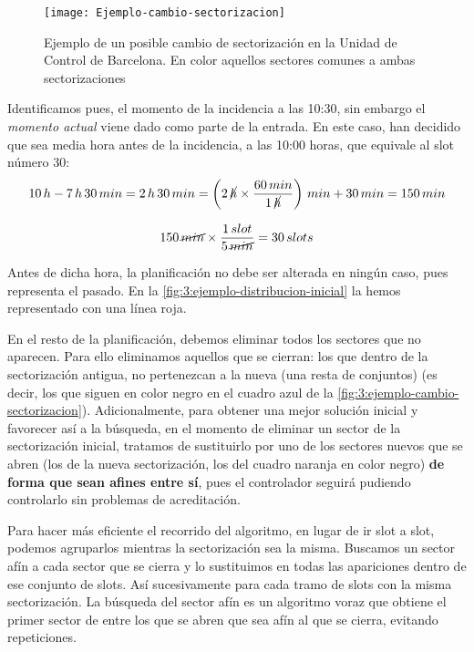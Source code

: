 \begin{figure}[htbp]
	\centering
	\texttt{[image: Ejemplo-cambio-sectorizacion]}
	\caption[Ejemplo de cambio de sectorización]{Ejemplo de un posible cambio de sectorización en la Unidad de Control 
	de Barcelona. En color aquellos sectores comunes a ambas sectorizaciones}
	\label{fig:3:ejemplo-cambio-sectorizacion}
\end{figure}


Identificamos pues, el momento de la incidencia a las 10:30, sin embargo el \textit{momento actual} viene dado como parte de la entrada. En este caso, han decidido que sea media hora antes de la incidencia, a las 10:00 horas, que equivale al slot número 30:
\[ 
	10 \,h-7 \,h \,30 \,min = 2 \,h \,30 \,min = \left(2 \, \cancel{h} \times \frac{60 \,min}{1 \,\cancel{h}}\right) 
	\,min + 30\,min = 150 
	\,min 
\]

\[
	150 \,\cancel{min} \times \frac{1\,slot}{5\,\cancel{min}} = 30\,slots
\]

Antes de dicha hora, la planificación no debe ser alterada en ningún caso, pues representa el pasado. En la 
\autoref{fig:3:ejemplo-distribucion-inicial} la hemos representado con una línea roja. 

En el resto de la planificación, debemos eliminar todos los sectores que no aparecen. Para ello eliminamos aquellos que se cierran: los que dentro de la sectorización antigua, no pertenezcan a la nueva (una resta de conjuntos) (es decir, los que siguen en color negro en el cuadro azul de la \autoref{fig:3:ejemplo-cambio-sectorizacion}). 
Adicionalmente, para obtener una mejor solución inicial y favorecer así a la búsqueda, en el momento de eliminar un sector de la sectorización inicial, tratamos de sustituirlo por uno de los sectores nuevos que se abren (los de la nueva sectorización, los del cuadro naranja en color negro) \textbf{de forma que sean afines entre sí}, pues el controlador seguirá pudiendo controlarlo sin problemas de acreditación. %

Para hacer más eficiente el recorrido del algoritmo, en lugar de ir slot a slot, podemos agruparlos mientras la sectorización sea la misma. Buscamos un sector afín a cada sector que se cierra y lo sustituimos en todas las apariciones dentro de ese conjunto de slots. Así sucesivamente para cada tramo de slots con la misma sectorización. 
La búsqueda del sector afín es un algoritmo voraz que obtiene el primer sector de entre los que se abren que sea afín al que se cierra, evitando repeticiones.

